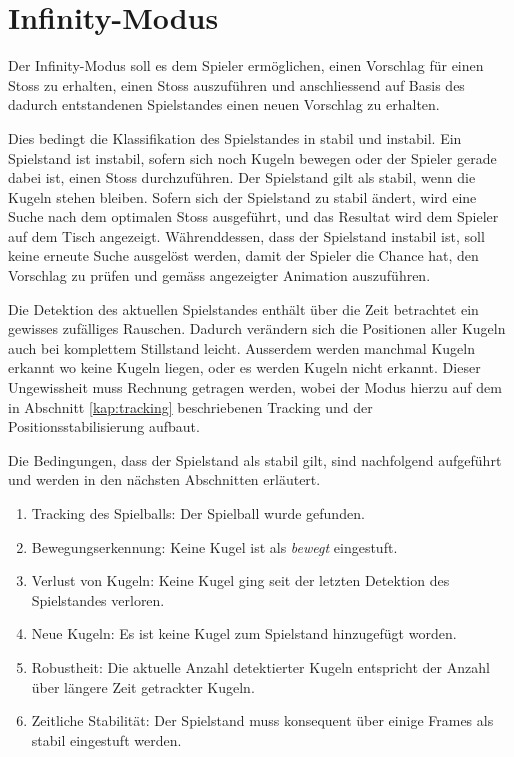 \section{Infinity-Modus}
Der Infinity-Modus soll es dem Spieler ermöglichen, einen Vorschlag für einen Stoss zu erhalten,
einen Stoss auszuführen und anschliessend auf Basis des dadurch entstandenen Spielstandes einen neuen Vorschlag zu erhalten.

Dies bedingt die Klassifikation des Spielstandes in stabil und instabil. Ein Spielstand ist instabil, sofern sich noch Kugeln
bewegen oder der Spieler gerade dabei ist, einen Stoss durchzuführen. Der Spielstand gilt als stabil, wenn die Kugeln
stehen bleiben. Sofern sich der Spielstand zu stabil ändert, wird eine Suche nach dem optimalen Stoss ausgeführt,
und das Resultat wird dem Spieler auf dem Tisch angezeigt. Währenddessen, dass der Spielstand instabil ist, soll keine erneute
Suche ausgelöst werden, damit der Spieler die Chance hat, den Vorschlag zu prüfen und gemäss angezeigter Animation auszuführen.

Die Detektion des aktuellen Spielstandes enthält über die Zeit betrachtet ein gewisses zufälliges Rauschen.
Dadurch verändern sich die Positionen aller Kugeln auch bei komplettem Stillstand leicht.
Ausserdem werden manchmal Kugeln erkannt wo keine Kugeln liegen, oder es werden Kugeln nicht erkannt.
Dieser Ungewissheit muss Rechnung getragen werden, wobei der Modus hierzu auf dem in Abschnitt \ref{kap:tracking}
beschriebenen Tracking und der Positionsstabilisierung aufbaut.

Die Bedingungen, dass der Spielstand als stabil gilt, sind nachfolgend aufgeführt und werden in den nächsten Abschnitten erläutert.
\begin{enumerate}
    \item Tracking des Spielballs: Der Spielball wurde gefunden.
    \item Bewegungserkennung: Keine Kugel ist als \emph{bewegt} eingestuft.
    \item Verlust von Kugeln: Keine Kugel ging seit der letzten Detektion des Spielstandes verloren.
    \item Neue Kugeln: Es ist keine Kugel zum Spielstand hinzugefügt worden.
    \item Robustheit: Die aktuelle Anzahl detektierter Kugeln entspricht der Anzahl über längere Zeit getrackter Kugeln.
    \item Zeitliche Stabilität: Der Spielstand muss konsequent über einige Frames als stabil eingestuft werden.
\end{enumerate}

